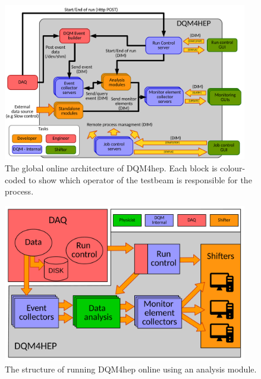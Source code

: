\begin{figure}[h]
	\centering
	\includegraphics[width=0.95\textwidth]{../Pictures/GlobalArchitectureDiagram.pdf}
	\caption{The global online architecture of DQM4hep. Each block is colour-coded to show which operator of the testbeam is responsible for the process.}
	\label{figure:daq/dqm4hep/architecture}
\end{figure}

\begin{figure}
	\centering
	\includegraphics[width=0.95\textwidth]{../Pictures/AnalysisModuleArchitecture.pdf}
	\caption{The structure of running DQM4hep online using an analysis module.}
	\label{figure:daq/dqm4hep/analysis-module}
\end{figure}

